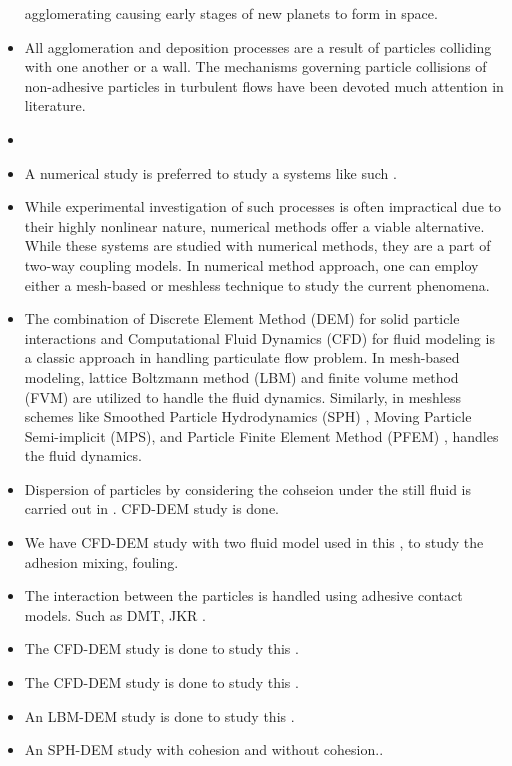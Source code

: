 \documentclass[preprint,12pt]{elsarticle}
\newcommand{\todoin}{\todo[inline]}
\begin{document}
\begin{itemize}
  agglomerating causing early stages of new planets to form in space.
\item All agglomeration and deposition processes are a result of particles
  colliding with one another or a wall. The mechanisms governing particle
  collisions of non-adhesive particles in turbulent flows have been devoted
  much attention in literature.
\item {}
\item A numerical study is preferred to study a systems like such \cite{xxxx}.
\item While experimental investigation of such processes is often
  impractical due to their highly nonlinear nature, numerical methods offer a
  viable alternative.  While these systems are studied with numerical methods,
  they are a part of two-way coupling models. In numerical method approach,
  one can employ either a mesh-based or meshless technique to study the
  current phenomena.
\end{itemize}


\begin{itemize}
\item The combination of Discrete Element Method (DEM) for solid particle
  interactions and Computational Fluid Dynamics (CFD) for fluid modeling is a
  classic approach in handling particulate flow problem. In mesh-based
  modeling, lattice Boltzmann method (LBM) \cite{xiong2014lbm} and finite
  volume method (FVM) \cite{kloss2012models} are utilized to handle the fluid
  dynamics. Similarly, in meshless schemes like Smoothed Particle
  Hydrodynamics (SPH) \cite{peng2021fully}, Moving Particle Semi-implicit
  (MPS), and Particle Finite Element Method (PFEM) \cite{li2019modeling,
    franci2020pfem}, handles the fluid dynamics.
\item Dispersion of particles by considering the cohseion under the still
  fluid is carried out in \cite{lu2019experiments}. CFD-DEM study is done.
\item We have CFD-DEM study with two fluid model used in this ,
  to study the adhesion mixing, fouling.
\item The interaction between the particles is handled using adhesive contact
  models. Such as DMT, JKR .
\item The CFD-DEM study is done to study this \todoin{\cite{xxxx}}.
\item The CFD-DEM study is done to study this \todoin{\cite{xxxx}}.
\item An LBM-DEM study is done to study this \todoin{\cite{xxxx}}.
\item An SPH-DEM study with cohesion and without cohesion.\todoin{\cite{xxxx}}.
\end{itemize}
\end{document}
